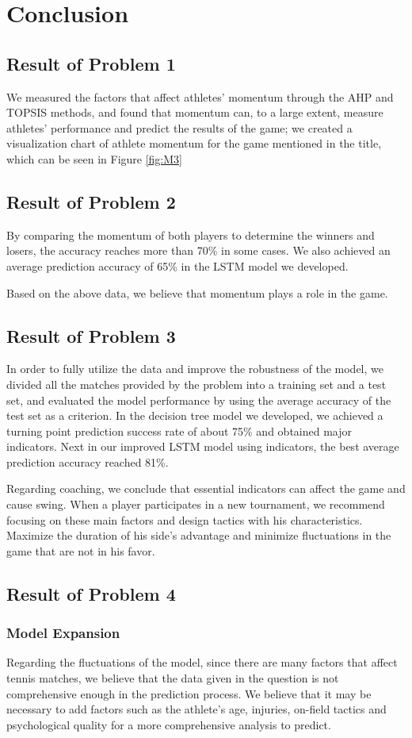 \section{Conclusion}
\subsection{Result of Problem 1}
We measured the factors that affect athletes' momentum through the AHP and TOPSIS methods, and found that momentum can, to a large extent, measure athletes' performance and predict the results of the game; we created a visualization chart of athlete momentum for the game mentioned in the title, which can be seen in Figure \ref{fig:M3}
\subsection{Result of Problem 2}
By comparing the momentum of both players to determine the winners and losers, the accuracy reaches more than 70\% in some cases. We also achieved an average prediction accuracy of 65\% in the LSTM model we developed. \par
Based on the above data, we believe that momentum plays a role in the game. 
\subsection{Result of Problem 3}
In order to fully utilize the data and improve the robustness of the model, we divided all the matches provided by the problem into a training set and a test set, and evaluated the model performance by using the average accuracy of the test set as a criterion. In the decision tree model we developed, we achieved a turning point prediction success rate of about 75\% and obtained major indicators. Next in our improved LSTM model using indicators, the best average prediction accuracy reached 81\%. \par
Regarding coaching, we conclude that essential indicators can affect the game and cause swing. When a player participates in a new tournament, we recommend focusing on these main factors and design tactics with his characteristics. Maximize the duration of his side's advantage and minimize fluctuations in the game that are not in his favor. \par
\subsection{Result of Problem 4}
\subsubsection{Model Expansion}
Regarding the fluctuations of the model, since there are many factors that affect tennis matches, we believe that the data given in the question is not comprehensive enough in the prediction process. We believe that it may be necessary to add factors such as the athlete's age, injuries, on-field tactics and psychological quality for a more comprehensive analysis to predict.
